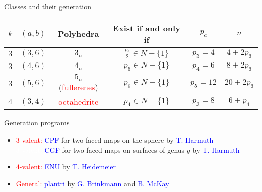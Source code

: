 \documentclass[%
pdf,
colorBG,
slideColor,
]{prosper}
\begin{document}
\begin{slide}{Classes and their generation}
\vspace{-2mm}
{\tiny
\begin{center}
\begin{tabular}{||c|c||c|c|c|c||}
\hline
\hline
$k$ & $(a,b)$ & Polyhedra & Exist if and only if & $p_a$ & $n$\\ \hline\hline
$3$ & $(3,6)$ & $3_{n}$ & $\frac{p_{6}}{2} \in N-\{1\}$ & $p_3=4$ &$4+2p_6$\\  \hline
$3$ & $(4,6)$ & $4_{n}$ & $p_{6} \in N-\{1\}$ & $p_4=6$ &$8+2p_6$\\ \hline
$3$ & $(5,6)$ & $5_{n}$ (\textcolor{red}{fullerenes}) & $p_6\in N-\{1\}$& $p_5=12$ &$20+2p_6$\\ \hline\hline
$4$ & $(3,4)$ & \textcolor{red}{octahedrite} & $p_{4} \in N-\{1\}$ & $p_3=8$ &$6+p_4$\\ \hline\hline
\end{tabular}
\end{center}
}
\begin{center}
Generation programs
\end{center}

\begin{itemize}
\item \textcolor{red}{$3$-valent:} \textcolor{blue}{CPF} for two-faced maps on the sphere by \textcolor{blue}{T. Harmuth}\\
\textcolor{white}{$3$-valent:} \textcolor{blue}{CGF} for two-faced maps on surfaces of genus $g$ by \textcolor{blue}{T. Harmuth}
\item \textcolor{red}{$4$-valent:} \textcolor{blue}{ENU} by \textcolor{blue}{T. Heidemeier}
\item \textcolor{red}{General:} \textcolor{blue}{plantri} by \textcolor{blue}{G. Brinkmann} and \textcolor{blue}{B. McKay}
\end{itemize}

%

\end{slide}
\end{document}

